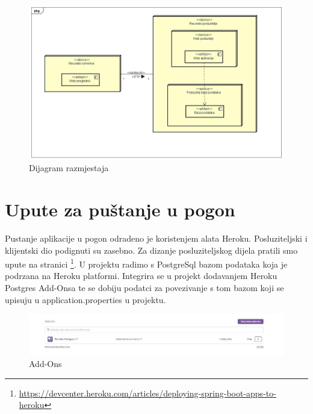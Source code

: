 			\begin{figure}[H]
				
				\includegraphics[width=\textwidth]{slike/Deployment Diagram0.jpg} %
				\centering
				\caption{Dijagram razmjestaja}
				\label{fig:dijagramraz}
			\end{figure}
			\eject 
		
		\section{Upute za puštanje u pogon}
		
		Pustanje aplikacije u pogon odradeno je koristenjem alata Heroku. Posluziteljski i klijentski dio podignuti su zasebno. Za dizanje posluziteljskog dijela pratili smo upute na stranici \footnote{\url{ https://devcenter.heroku.com/articles/deploying-spring-boot-apps-to-heroku}}.
		U projektu radimo s PostgreSql bazom podataka koja je podrzana na Heroku platformi. Integrira se u projekt dodavanjem Heroku Postgres Add-Onsa te se dobiju podatci za povezivanje s tom bazom koji se upisuju u application.properties u projektu.
		
		\begin{figure}[H]
			
			\includegraphics[width=\textwidth]{slike/prva.jpg} %
			\centering
			\caption{Add-Ons}
			\label{fig:addons}
		\end{figure}
	
